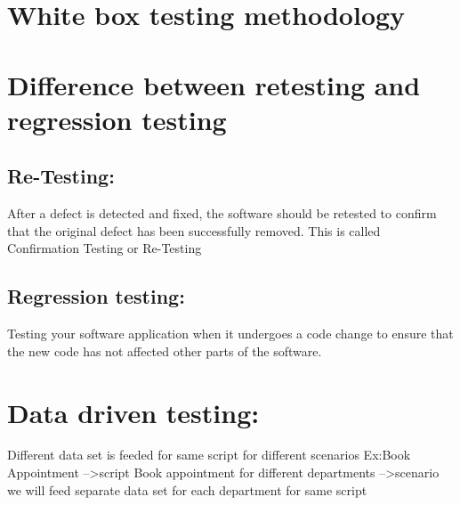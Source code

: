 \documentclass[12pt, oneside]{article}
\begin{document}
\section{White box testing methodology}

\section{Difference between retesting and regression testing}
\subsection{Re-Testing:}
After a defect is detected and fixed, the software should be retested to confirm that the original defect has been successfully removed. This is called Confirmation Testing or Re-Testing
\subsection{Regression testing:}
Testing your software application when it undergoes a code change to ensure that the new code has not affected other parts of the software.

\section{Data driven testing:}
Different data set is feeded for same script for different scenarios
Ex:Book Appointment -->script
Book appointment for different departments -->scenario
we will feed separate data set for each department for same script
\end{document}
